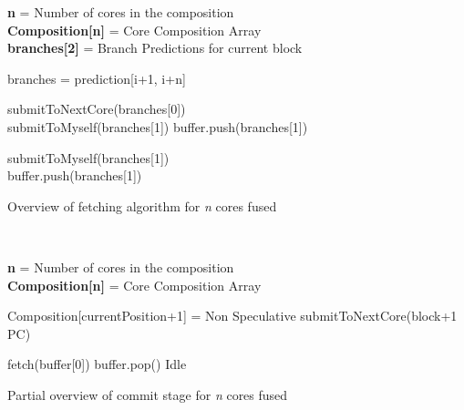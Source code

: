 \begin{algorithm}

\textbf{n} = Number of cores in the composition\\
\textbf{Composition[n]} = Core Composition Array\\
\textbf{branches[2]} = Branch Predictions for current block\\

{
branches = prediction[i+1, i+n]\\
{
	{
		submitToNextCore(branches[0])\\
		
		{
			submitToMyself(branches[1])
		}
		{
			buffer.push(branches[1])\\
		}
	}
	{
	{
		submitToMyself(branches[1])\\
	}
	{
		buffer.push(branches[1])\\
	}
	
	}
}
}
\caption{Overview of fetching algorithm for \textit{n} cores fused}~\label{alg:fetch}
\end{algorithm}

\begin{algorithm}
\textbf{n} = Number of cores in the composition\\
\textbf{Composition[n]} = Core Composition Array\\

{
	{
		Composition[currentPosition+1] = Non Speculative\;
	}
	{
		submitToNextCore(block+1 PC)
	}
	
	{
		fetch(buffer[0])
		buffer.pop()
	}
	\Else
	{
		Idle
	}
}
\vspace{-1em}
\caption{Partial overview of commit stage for \textit{n} cores fused}~\label{alg:commit}
\end{algorithm}

